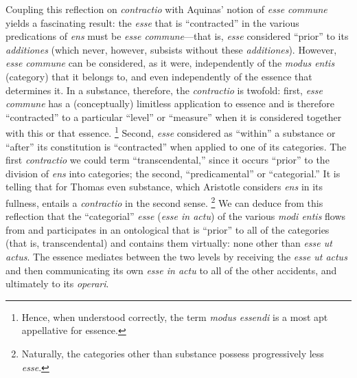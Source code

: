 Coupling this reflection on \emph{contractio} with Aquinas' notion of \emph{esse commune} yields a fascinating result: the \emph{esse} that is ``contracted'' in the various predications of \emph{ens} must be \emph{esse commune}---that is, \emph{esse} considered ``prior'' to its \emph{additiones} (which never, however, subsists without these \emph{additiones}). However, \emph{esse commune} can be considered, as it were, independently of the \emph{modus entis} (category) that it belongs to, and even independently of the essence that determines it. In a substance, therefore, the \emph{contractio} is twofold: first, \emph{esse commune} has a (conceptually) limitless application to essence and is therefore ``contracted'' to a particular ``level'' or ``measure'' when it is considered together with this or that essence.%
%
\footnote{Hence, when understood correctly, the term \emph{modus essendi} is a most apt appellative for essence.}
%
Second, \emph{esse} considered as ``within'' a substance or ``after'' its constitution is ``contracted'' when applied to one of its categories. The first \emph{contractio} we could term ``transcendental,'' since it occurs ``prior'' to the division of \emph{ens} into categories; the second, ``predicamental'' or ``categorial.'' It is telling that for Thomas even substance, which Aristotle considers \emph{ens} in its fullness, entails a \emph{contractio} in the second sense.%
%
\footnote{Naturally, the categories other than substance possess progressively less \emph{esse}.}
%
We can deduce from this reflection that the ``categorial'' \emph{esse} (\emph{esse in actu}) of the various \emph{modi entis} flows from and participates in an ontological  that is ``prior'' to all of the categories (that is, transcendental) and contains them virtually: none other than \emph{esse ut actus}. The essence mediates between the two levels by receiving the \emph{esse ut actus} and then communicating its own \emph{esse in actu} to all of the other accidents, and ultimately to its \emph{operari}.

